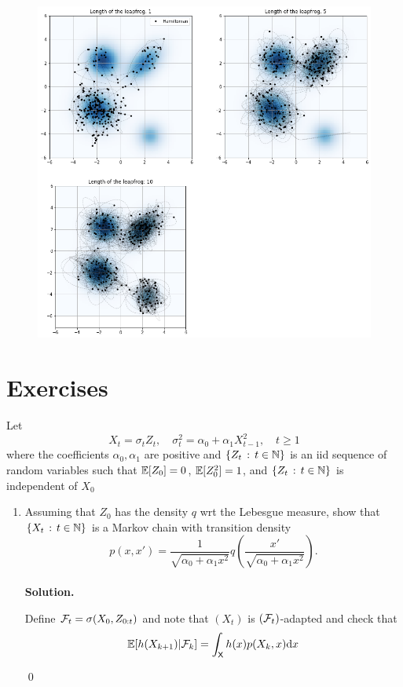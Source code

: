 \documentclass[english,graybox,envcountchap,envcountsame,sectrefs,shortlabels]{svmono}
\theoremstyle{style}
\newenvironment{answer}{\noindent \\ \textbf{Solution.}\begin{leftbar} \footnotesize}{\hfill \qed \end{leftbar}}
\begin{document}
\begin{figure} 
\label{fig:hmc:mixture}
\centering
\includegraphics[scale=0.4]{HMC_mixture}
\end{figure}

\section{Exercises}
\begin{exercise}
\label{ex:arch}
Let
\[
X_{t}=\sigma_{t}Z_{t},\quad\sigma_{t}^2=\alpha_{0}+\alpha_{1}X_{t-1}^{2},\quad t\geq1
\]
where the coefficients $\alpha_{0},\alpha_{1}$ are positive and $\left\{ Z_{t}\,:\,t\in\mathbb{N}\right\}$
is an iid sequence of random variables such that $\mathbb{E}[Z_{0}]=0$,
$\mathbb{E}[Z_{0}^{2}]=1$, and $\left\{ Z_{t}\,:\,t\in\mathbb{N}\right\}$ is
independent of $X_{0}$
\begin{enumerate}
\item Assuming that $Z_{0}$ has the density $q$ wrt the Lebesgue measure,
show that $\left\{ X_{t}\,:\,t\in\mathbb{N}\right\}$ is a Markov chain with transition
density
\[
p(x,x')=\frac{1}{\sqrt{\alpha_{0}+\alpha_{1}x^{2}}}q\left(\frac{x'}{\sqrt{\alpha_{0}+\alpha_{1}x^{2}}}\right).
\]
\begin{answer}
Define $\mathcal{F}_t=\sigma(X_0,Z_{0:t})$ and note that $(X_t)$ is $(\mathcal{F}_t)$-adapted and check that
$$
\mathbb{E}[h(X_{k+1})|\mathcal{F}_k]=\int_{\mathsf{X}} h(x) p(X_k,x)\mathrm{d} x
$$

\end{answer}

\end{enumerate}
\end{exercise}
\end{document}
